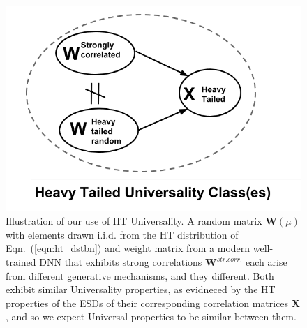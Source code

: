 




\begin{figure}[t]  %
   \centering
   \includegraphics[scale=0.40]{img/universality_classes.png} 
   \caption{Illustration of our use of HT Universality.  
            A random matrix $\mathbf{W}(\mu)$ with elements drawn i.i.d. from the HT distribution of Eqn.~(\ref{eqn:ht_dstbn}) and weight matrix from a modern well-trained DNN that exhibits strong correlations $\mathbf{W}^{str. corr.}$ each arise from different generative mechanisms, and they different.  Both exhibit similar Universality properties, as evidneced by the HT properties of the ESDs of their corresponding correlation matrices $\mathbf{X}$, and so we expect Universal properties to be similar between them.}
   \label{fig:universality_diagram}
\end{figure}


